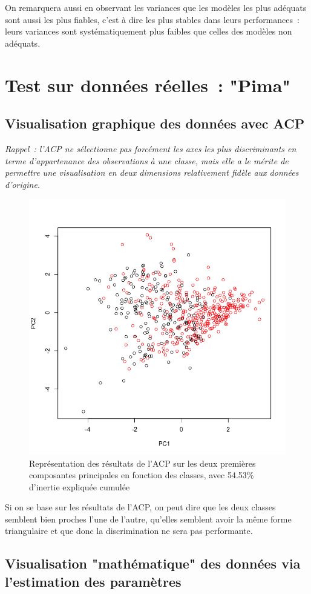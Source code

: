 \documentclass[a4paper,10pt]{report}
\begin{document}
On remarquera aussi en observant les variances que les modèles les plus adéquats sont aussi les plus fiables, c'est à dire les plus stables dans leurs performances~: leurs variances sont systématiquement plus faibles que celles des modèles non adéquats.

\section{Test sur données réelles~: "Pima"}

\subsection{Visualisation graphique des données avec ACP}

\textit{Rappel~: l'ACP ne sélectionne pas forcément les axes les plus discriminants en terme d'appartenance des observations à une classe, mais elle a le mérite de permettre une visualisation en deux dimensions relativement fidèle aux données d'origine.}\\

\begin{figure}[H]
	\centering
	\captionsetup{justification=centering, margin=2cm}
	\includegraphics[width=.5\linewidth]{img/2-2-1-ACP-Pima-representation}
	\caption{\small Représentation des résultats de l'ACP sur les deux premières composantes principales en fonction des classes, avec 54.53\% d'inertie expliquée cumulée}
	\label{fig:2-2-1-ACP-Pima-representation}%
\end{figure}

Si on se base sur les résultats de l'ACP, on peut dire que les deux classes semblent bien proches l'une de l'autre, qu'elles semblent avoir la même forme triangulaire et que donc la discrimination ne sera pas performante.


\subsection{Visualisation "mathématique" des données via l'estimation des paramètres}
\end{document}

